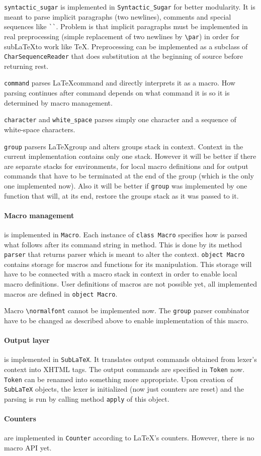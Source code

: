 \documentclass{article}
\begin{document}
\verb+syntactic_sugar+ is implemented in \verb+Syntactic_Sugar+
for better modularity. It is meant to parse implicit paragraphs (two newlines), comments and
special sequences like \verb+``+. Problem is that implicit paragraphs must be implemented
in real preprocessing (simple replacement of two newlines by \verb+\par+)
in order for sub\LaTeX to work like \TeX.%
Preprocessing can be implemented as a subclass of \verb+CharSequenceReader+
that does substitution at the beginning of source before returning rest.

\verb+command+ parses \LaTeX command and directly interprets it as a macro.
How parsing continues after command depends on what command it is so it is determined by macro management.

\verb+character+ and \verb+white_space+ parses simply one character and a sequence of white-space characters.

\verb+group+ parsers \LaTeX group and alters groups stack in context.
Context in the current implementation contains only one stack.
However it will be better if there are separate stacks for environments, for local macro definitions
and for output commands that have to be terminated at the end of the group (which is the only one implemented now).
Also it will be better if \verb+group+ was implemented by one function
that will, at its end, restore the groups stack as it was passed to it.

\paragraph{Macro management} is implemented in \verb+Macro+.
Each instance of \verb+class Macro+ specifies how is parsed what follows after its command string in method.
This is done by its method \verb+parser+ that returns parser which is meant to alter the context.
\verb+object Macro+ contains storage for macros and functions for its manipulation.
This storage will have to be connected with a macro stack in context in order to enable local macro definitions.
User definitions of macros are not possible yet, all implemented macros are defined in \verb+object Macro+.

Macro \verb+\normalfont+ cannot be implemented now. The \verb+group+ parser combinator have to be changed
as described above to enable implementation of this macro.

\paragraph{Output layer} is implemented in \verb+SubLaTeX+. It translates output commands obtained from
lexer's context into XHTML tags. The output commands are specified in \verb+Token+ now.
\verb+Token+ can be renamed into something more appropriate.
Upon creation of \verb+SubLaTeX+ objects, the lexer is initialized (now just counters are reset)
and the parsing is run by calling method \verb+apply+ of this object.

\paragraph{Counters} are implemented in \verb+Counter+ according to \LaTeX's counters.
However, there is no macro API yet.
\end{document}
